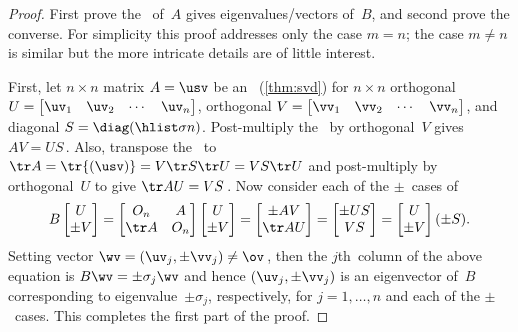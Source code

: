 \begin{proof} 
First prove the \svd\ of~\(A\) gives eigenvalues\slash vectors of~\(B\), and second prove the converse.
For simplicity this proof addresses only the case \(m=n\); the case \(m\neq n\) is similar but the more intricate details are of little interest.

First, let \(n\times n\) matrix \(A=\usv\) be an \svd\ (\autoref{thm:svd}) for \(n\times n\) orthogonal \(U=\begin{bmatrix} \uv_1&\uv_2&\cdots&\uv_n \end{bmatrix}\),  orthogonal \(V=\begin{bmatrix} \vv_1&\vv_2&\cdots&\vv_n \end{bmatrix}\), and diagonal \(S=\diag(\hlist\sigma n)\).
Post-multiply the \svd\ by orthogonal~\(V\) gives \(AV=US\)\,.
Also, transpose the \svd\ to \(\tr A=\tr{(\usv)}=V\tr S\tr U=VS\tr U\) and post-multiply by orthogonal~\(U\) to give \(\tr AU=VS\)\,.
Now consider each of the \(\pm\)~cases of
\begin{equation*}
B\begin{bmatrix} U\\\pm V \end{bmatrix}
=\begin{bmatrix} O_n&A\\\tr A&O_n \end{bmatrix}\begin{bmatrix} U\\\pm V \end{bmatrix}
=\begin{bmatrix} \pm AV\\\tr AU \end{bmatrix}
=\begin{bmatrix} \pm US\\VS \end{bmatrix}
=\begin{bmatrix} U\\\pm V \end{bmatrix}(\pm S).
\end{equation*}
Setting vector \(\wv=(\uv_j,\pm\vv_j)\neq\ov\)\,, then the \(j\)th~column of the above equation is \(B\wv=\pm\sigma_j\wv\) and hence \((\uv_j,\pm\vv_j)\) is an eigenvector of~\(B\) corresponding to eigenvalue~\(\pm\sigma_j\), respectively, for \(j=1,\ldots,n\) and each of the \(\pm\)~cases.
This completes the first part of the proof.


\end{proof}
